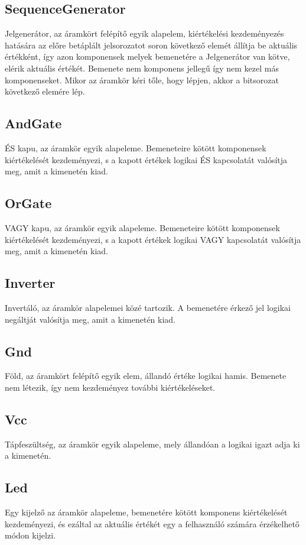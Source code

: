 \subsection{\bf SequenceGenerator}
Jelgenerátor, az áramkört felépítő egyik alapelem, kiértékelési kezdeményezés hatására az előre betáplált jelsorozatot soron következő elemét állítja be aktuális értékként, így azon komponensek melyek bemenetére a Jelgenerátor van kötve, elérik aktuális értékét. Bemenete nem komponens jellegű így nem kezel más komponenseket. Mikor az áramkör kéri tőle, hogy lépjen, akkor a bitsorozat következő elemére lép.

\subsection{\bf AndGate}
ÉS kapu, az áramkör egyik alapeleme. Bemeneteire kötött komponensek kiértékelését kezdeményezi, s a kapott értékek logikai ÉS kapcsolatát valósítja meg, amit a kimenetén kiad.

\subsection{\bf OrGate}
VAGY kapu, az áramkör egyik alapeleme. Bemeneteire kötött komponensek kiértékelését kezdeményezi, s a kapott értékek logikai VAGY kapcsolatát valósítja meg, amit a kimenetén kiad.

\subsection{\bf Inverter}
Invertáló, az áramkör alapelemei közé tartozik. A bemenetére érkező jel logikai negáltját valósítja meg, amit a kimenetén kiad.

\subsection{\bf Gnd}
Föld, az áramkört felépítő egyik elem, állandó értéke logikai hamis. Bemenete nem létezik, így nem kezdeményez további kiértékeléseket.

\subsection{\bf Vcc}
Tápfeszültség, az áramkör egyik alapeleme, mely állandóan a logikai igazt adja ki a kimenetén.

\subsection{\bf Led}
Egy kijelző az áramkör alapeleme, bemenetére kötött komponens kiértékelését kezdeményezi, és ezáltal az aktuális értékét egy a felhasználó számára érzékelhető módon kijelzi.

